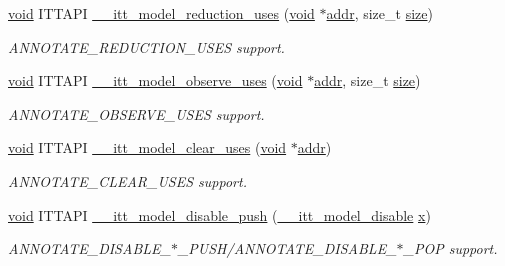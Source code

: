 \begin{DoxyCompactItemize}
\hyperlink{ittnotify__static_8h_af941d56e55e3c5465135b60c4d6343ed}{void} I\-T\-T\-A\-P\-I \hyperlink{group__model_ga49bb058451c4b6b44ff26f1d5ee9b2cc}{\-\_\-\-\_\-itt\-\_\-model\-\_\-reduction\-\_\-uses} (\hyperlink{ittnotify__static_8h_af941d56e55e3c5465135b60c4d6343ed}{void} $\ast$\hyperlink{ittnotify__static_8h_a7e21c61c16fffcc27199a9d66ff39ab8}{addr}, size\-\_\-t \hyperlink{ittnotify__static_8h_a5a1daa0c1d342747e3884fa54fc64fb1}{size})
\begin{DoxyCompactList}\small\item\em A\-N\-N\-O\-T\-A\-T\-E\-\_\-\-R\-E\-D\-U\-C\-T\-I\-O\-N\-\_\-\-U\-S\-E\-S support. \end{DoxyCompactList}\item 
\hyperlink{ittnotify__static_8h_af941d56e55e3c5465135b60c4d6343ed}{void} I\-T\-T\-A\-P\-I \hyperlink{group__model_ga54ad5dad8921751223d07ac65c651d9b}{\-\_\-\-\_\-itt\-\_\-model\-\_\-observe\-\_\-uses} (\hyperlink{ittnotify__static_8h_af941d56e55e3c5465135b60c4d6343ed}{void} $\ast$\hyperlink{ittnotify__static_8h_a7e21c61c16fffcc27199a9d66ff39ab8}{addr}, size\-\_\-t \hyperlink{ittnotify__static_8h_a5a1daa0c1d342747e3884fa54fc64fb1}{size})
\begin{DoxyCompactList}\small\item\em A\-N\-N\-O\-T\-A\-T\-E\-\_\-\-O\-B\-S\-E\-R\-V\-E\-\_\-\-U\-S\-E\-S support. \end{DoxyCompactList}\item 
\hyperlink{ittnotify__static_8h_af941d56e55e3c5465135b60c4d6343ed}{void} I\-T\-T\-A\-P\-I \hyperlink{group__model_ga5233fcd88ce2279d95bbc02c0bc1419b}{\-\_\-\-\_\-itt\-\_\-model\-\_\-clear\-\_\-uses} (\hyperlink{ittnotify__static_8h_af941d56e55e3c5465135b60c4d6343ed}{void} $\ast$\hyperlink{ittnotify__static_8h_a7e21c61c16fffcc27199a9d66ff39ab8}{addr})
\begin{DoxyCompactList}\small\item\em A\-N\-N\-O\-T\-A\-T\-E\-\_\-\-C\-L\-E\-A\-R\-\_\-\-U\-S\-E\-S support. \end{DoxyCompactList}\item 
\hyperlink{ittnotify__static_8h_af941d56e55e3c5465135b60c4d6343ed}{void} I\-T\-T\-A\-P\-I \hyperlink{group__model_ga8b1f02078fd0d9c95c18b2f51a2020db}{\-\_\-\-\_\-itt\-\_\-model\-\_\-disable\-\_\-push} (\hyperlink{group__model_ga1202045d9271afd9f59f323a9fe30622}{\-\_\-\-\_\-itt\-\_\-model\-\_\-disable} \hyperlink{ittnotify__static_8h_a25eb27b280775b27a5ddc4d1673225aa}{x})
\begin{DoxyCompactList}\small\item\em A\-N\-N\-O\-T\-A\-T\-E\-\_\-\-D\-I\-S\-A\-B\-L\-E\-\_\-$\ast$\-\_\-\-P\-U\-S\-H/\-A\-N\-N\-O\-T\-A\-T\-E\-\_\-\-D\-I\-S\-A\-B\-L\-E\-\_\-$\ast$\-\_\-\-P\-O\-P support. \end{DoxyCompactList}\item 

\end{DoxyCompactItemize}
